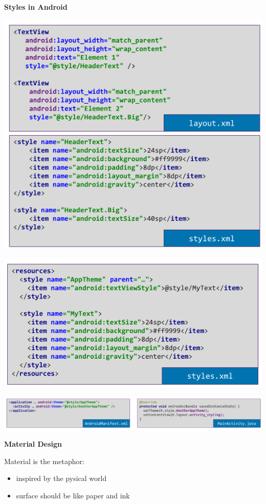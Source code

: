 \documentclass[11pt,twoside,landscape]{article}
\begin{document}
\begin{multicols}{3}
\textbf{Styles in Android}

\begin{center}
\includegraphics[width=.9\linewidth]{img/styling_in_the_android_sdk.png}
\end{center}

\begin{center}
\includegraphics[width=.9\linewidth]{img/theme_definition.png}
\end{center}

\begin{center}
\includegraphics[width=.9\linewidth]{img/use_themes_in_android.png}
\end{center}


\textbf{Material Design}

Material is the metaphor:
\begin{itemize}
\item inspired by the pysical world
\item surface should be like paper and ink
\end{itemize}


\end{multicols}
\end{document}
